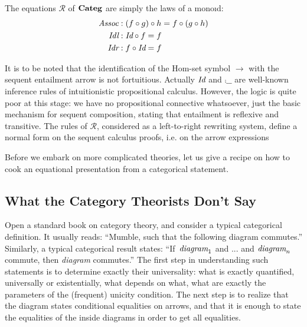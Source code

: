 The equations $\mathcal R$ of ${\mathbf {Categ}}$ are simply the laws of a monoıd:
\begin{align*}
\text{\it Assoc} &: (f \circ g) \circ h = f \circ (g \circ h)\\
\text{\it Idl} &: \text{\it Id} \circ f = f\\
\text{\it Idr} &: f \circ \text{\it Id} = f
\end{align*}

It is to be noted that the identification of the Hom-set symbol $\to$ with the sequent entailment
arrow is not fortuitious. Actually $\text{\it Id}$ and $\comp{\_}{\_}$
are well-known inference rules of intuitionistic propositional calculus.
However, the logic is quite poor at this stage: we have no propositional connective
whatsoever, just the basic mechanism for sequent composition, 
stating that entailment is reflexive
and transitive. The rules of $\mathcal R$, considered as a left-to-right
rewriting system, define a normal form
on the sequent calculus proofs, i.e. on the arrow expressions

Before we embark on more complicated theories, let us give a recipe on how to cook an equational
presentation from a categorical statement.

\subsection{What the Category Theorists Don’t Say}


Open a standard book on category theory, and consider a typical categorical definition.
It usually reads: ``Mumble, such that the following diagram commutes.''
Similarly, a typical categorical result states: 
``If $\,\text{\it diagram}_1$ and ... and $\text{\it diagram}_n$ commute, then {\it diagram}
commutes.''
The first step in understanding such statements is to determine exactly their universality:
what is exactly quantified, universally or existentially, what depends on what,
what are exactly the parameters of the (frequent) unicity condition.
The next step is to realize that the diagram states conditional
equalities on arrows, and that it is enough to state the equalities
of the inside diagrams in order to get all equalities.

